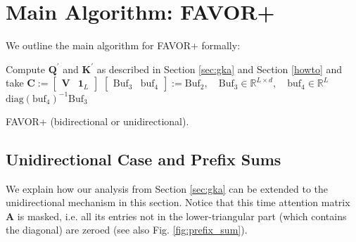 \newpage

\section{Main Algorithm: FAVOR+}
\label{appendix:main_algorithm}
We outline the main algorithm for FAVOR+ formally: 

\begin{algorithm}[h]
\SetAlgoLined
{}
Compute $\mathbf{Q}^{\prime}$ and $\mathbf{K}^{\prime}$ as described in Section \ref{sec:gka} and Section \ref{howto} and take $\mathbf{C} := \begin{bmatrix} \mathbf{V} & \mathbf{1}_L \end{bmatrix}$\;
$\begin{bmatrix} \mathrm{Buf}_3 & \mathrm{buf}_4 \end{bmatrix} := \mathrm{Buf}_2, \quad \mathrm{Buf}_3 \in \mathbb{R}^{L \times d}, \quad \mathrm{buf}_4 \in \mathbb{R}^L$\;
\Return $\mathrm{diag} (\mathrm{buf}_4)^{-1} \mathrm{Buf}_3$\;
\caption{FAVOR+ (bidirectional or unidirectional).}
\label{alg:1}
\end{algorithm}


\subsection{Unidirectional Case and Prefix Sums}
\label{subsec:unidirectional}
We explain how our analysis from Section \ref{sec:gka} can be extended to the unidirectional mechanism in this section.
Notice that this time attention matrix $\mathbf{A}$ is masked, i.e. all its entries not in the lower-triangular part (which contains the diagonal) are zeroed (see also Fig. \ref{fig:prefix_sum}).

